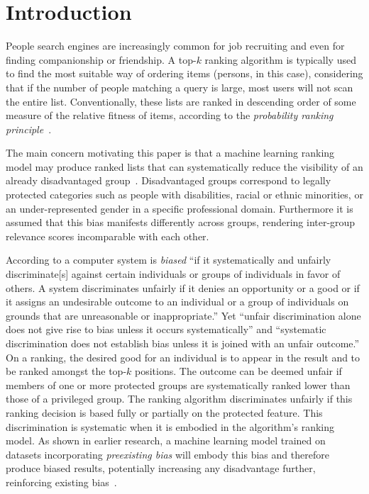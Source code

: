 \section{Introduction}\label{sec:introduction}

People search engines are increasingly common for job recruiting and even for finding companionship or friendship.
%
A top-$k$ ranking algorithm is typically used to find the most suitable way of ordering items (persons, in this case), considering that if the number of people matching a query is large, most users will not scan the entire list.
%
Conventionally, these lists are ranked in descending order of some measure of the relative fitness of items, according to the \emph{probability ranking principle}~\cite{robertson1977probability}.

The main concern motivating this paper is that a machine learning ranking model may produce ranked lists that can systematically reduce the visibility of an already disadvantaged group~\cite{peder2008,Dwork2012}.
%
Disadvantaged groups correspond to legally protected categories such as people with disabilities, racial or ethnic minorities, or an under-represented gender in a specific professional domain.
%
Furthermore it is assumed that this bias manifests differently across groups, rendering inter-group relevance scores incomparable with each other.


According to \citet{friedman1996bias} a computer system is \emph{biased} ``if it systematically and unfairly discriminate[s] against certain individuals or groups of individuals in favor of others.
%
A system discriminates unfairly if it denies an opportunity or a good or if it assigns an undesirable outcome to an individual or a group of individuals on grounds that are unreasonable or inappropriate.''
%
Yet ``unfair discrimination alone does not give rise to bias unless it occurs systematically'' and ``systematic discrimination does not establish bias unless it is joined with an unfair outcome.''
%
On a ranking, the desired good for an individual is to appear in the result and to be ranked amongst the top-$k$ positions.
%
The outcome can be deemed unfair if members of one or more protected groups are systematically ranked lower than those of a privileged group.
%
The ranking algorithm discriminates unfairly if this ranking decision is based fully or partially on the protected feature.
%
This discrimination is systematic when it is embodied in the algorithm's ranking model.
%
As shown in earlier research, a machine learning model trained on datasets incorporating \textit{preexisting bias} will embody this bias and therefore produce biased results, potentially increasing any disadvantage further, reinforcing existing bias~\cite{oneil2016weapons}.



